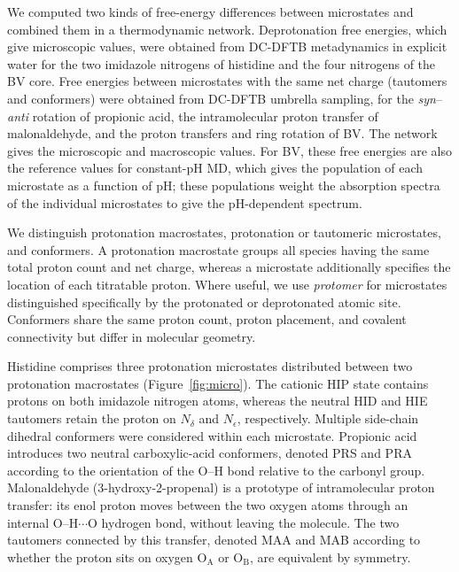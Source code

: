 
We computed two kinds of free-energy differences between microstates and combined them in a thermodynamic network.
Deprotonation free energies, which give microscopic \pka{} values, were obtained from DC-DFTB metadynamics in explicit water for the two imidazole nitrogens of histidine and the four nitrogens of the BV core.
Free energies between microstates with the same net charge (tautomers and conformers) were obtained from DC-DFTB umbrella sampling, for the \textit{syn}--\textit{anti} rotation of propionic acid, the intramolecular proton transfer of malonaldehyde, and the proton transfers and ring rotation of BV.
The network gives the microscopic and macroscopic \pka{} values.
For BV, these free energies are also the reference values for constant-pH MD, which gives the population of each microstate as a function of pH; these populations weight the absorption spectra of the individual microstates to give the pH-dependent spectrum.

We distinguish protonation macrostates, protonation or tautomeric microstates, and conformers.
A protonation macrostate groups all species having the same total proton count and net charge, whereas a microstate additionally specifies the location of each titratable proton.
Where useful, we use \emph{protomer} for microstates distinguished specifically by the protonated or deprotonated atomic site.
Conformers share the same proton count, proton placement, and covalent connectivity but differ in molecular geometry.

Histidine comprises three protonation microstates distributed between two protonation macrostates (Figure~\ref{fig:micro}).
The cationic HIP state contains protons on both imidazole nitrogen atoms, whereas the neutral HID and HIE tautomers retain the proton on $N_{\delta}$ and $N_{\epsilon}$, respectively.
Multiple side-chain dihedral conformers were considered within each microstate.
Propionic acid introduces two neutral carboxylic-acid conformers, denoted PRS and PRA according to the orientation of the O--H bond relative to the carbonyl group.
Malonaldehyde (3-hydroxy-2-propenal) is a prototype of intramolecular proton transfer: its enol proton moves between the two oxygen atoms through an internal O--H$\cdots$O hydrogen bond, without leaving the molecule.\cite{baughcumMicrowaveSpectroscopicStudy1981,wangFulldimensionalQuantumCalculations2008}
The two tautomers connected by this transfer, denoted MAA and MAB according to whether the proton sits on oxygen O$_\mathrm{A}$ or O$_\mathrm{B}$, are equivalent by symmetry.

